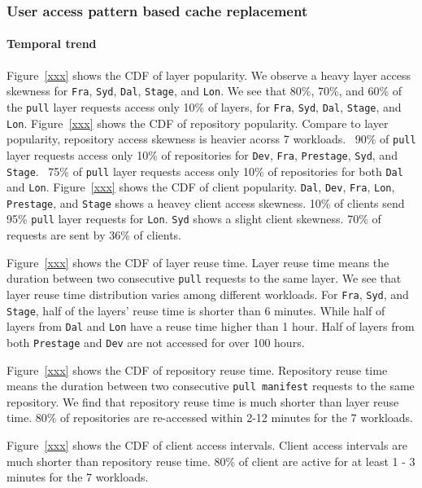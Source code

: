 \subsubsection{User access pattern  based cache replacement}

\paragraph{Temporal trend}

Figure~\ref{xxx} shows the CDF of layer popularity.
We observe a heavy layer access skewness for \texttt{Fra}, \texttt{Syd}, \texttt{Dal}, \texttt{Stage}, 
and \texttt{Lon}.
We see that 80\%, 70\%, and 60\% of the \texttt{pull} layer requests access only 10\% of layers, 
for \texttt{Fra}, \texttt{Syd}, \texttt{Dal}, \texttt{Stage}, 
and \texttt{Lon}.
Figure~\ref{xxx} shows the CDF of repository popularity.
Compare to layer popularity, 
repository access skewness is heavier acorss 7 workloads.
~90\% of \texttt{pull} layer requests access only 10\% of repositories for 
\texttt{Dev}, \texttt{Fra}, \texttt{Prestage}, \texttt{Syd}, and \texttt{Stage}.
~75\% of \texttt{pull} layer requests access only 10\% of repositories for
both \texttt{Dal} and \texttt{Lon}.
Figure~\ref{xxx} shows the CDF of client popularity.
\texttt{Dal}, \texttt{Dev}, \texttt{Fra}, \texttt{Lon}, \texttt{Prestage}, and \texttt{Stage}
shows a heavey client access skewness.
10\% of clients send 95\% \texttt{pull} layer requests for \texttt{Lon}.
\texttt{Syd} shows a slight client skewness. 70\% of requests are sent by 36\% of clients.

Figure~\ref{xxx} shows the CDF of layer reuse time. 
Layer reuse time means the duration between two consecutive \texttt{pull} requests to the same layer.
We see that layer reuse time distribution varies among different workloads.
For \texttt{Fra}, \texttt{Syd}, and \texttt{Stage},
half of the layers' reuse time is shorter than 6 minutes.
While half of layers from \texttt{Dal} and \texttt{Lon} have a reuse time higher than 1 hour.
Half of layers from both \texttt{Prestage} and \texttt{Dev} are not accessed for over 100 hours.

Figure~\ref{xxx} shows the CDF of repository reuse time.
Repository reuse time means the duration between two consecutive \texttt{pull manifest} requests to the same repository.
We find that repository reuse time is much shorter than layer reuse time.
80\% of repositories are re-accessed within 2-12 minutes for the 7 workloads.

Figure~\ref{xxx} shows the CDF of client access intervals.
Client access intervals are much shorter than repository reuse time.
80\% of client are active for at least 1 - 3 minutes for the 7 workloads. 




